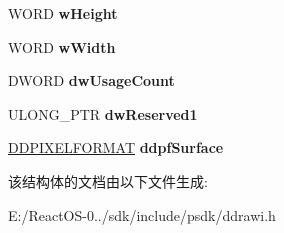 \begin{DoxyCompactItemize}
\begin{tabbing}
\end{tabbing}\item 
\mbox{\label{struct___d_d_r_a_w_i___d_d_r_a_w_s_u_r_f_a_c_e___g_b_l_a068d9a963a47be2536bc222e82137b73}} 
W\+O\+RD {\bfseries w\+Height}
\item 
\mbox{\label{struct___d_d_r_a_w_i___d_d_r_a_w_s_u_r_f_a_c_e___g_b_l_ab9cf6644b1233698f2422ab022de73e3}} 
W\+O\+RD {\bfseries w\+Width}
\item 
\mbox{\label{struct___d_d_r_a_w_i___d_d_r_a_w_s_u_r_f_a_c_e___g_b_l_ad78b9fdfab83db8af2054134263b709b}} 
D\+W\+O\+RD {\bfseries dw\+Usage\+Count}
\item 
\mbox{\label{struct___d_d_r_a_w_i___d_d_r_a_w_s_u_r_f_a_c_e___g_b_l_a2f42ea6642dddc656dde3b4ef7d3ecbe}} 
U\+L\+O\+N\+G\+\_\+\+P\+TR {\bfseries dw\+Reserved1}
\item 
\mbox{\label{struct___d_d_r_a_w_i___d_d_r_a_w_s_u_r_f_a_c_e___g_b_l_a0f2c7b534a7c74d4deceaa80f228c132}} 
\hyperlink{struct___d_d_p_i_x_e_l_f_o_r_m_a_t}{D\+D\+P\+I\+X\+E\+L\+F\+O\+R\+M\+AT} {\bfseries ddpf\+Surface}
\end{DoxyCompactItemize}


该结构体的文档由以下文件生成\+:\begin{DoxyCompactItemize}
\item 
E\+:/\+React\+O\+S-\/0../sdk/include/psdk/ddrawi.\+h\end{DoxyCompactItemize}
